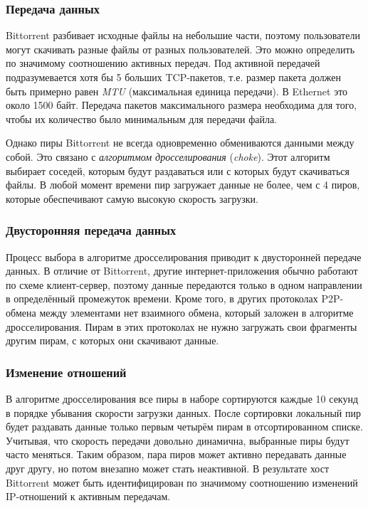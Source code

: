 \documentclass[bachelor, och, coursework]{SCWorks}
\begin{document}
\subsubsection{Передача данных}
Bittorrent разбивает исходные файлы на небольшие части, поэтому пользователи могут скачивать разные файлы
от разных пользователей. Это можно определить по значимому соотношению активных передач. Под активной передачей
подразумевается хотя бы 5 больших TCP-пакетов, т.е. размер пакета должен быть примерно равен \textit{MTU} (максимальная единица передачи). В Ethernet это около 1500 байт. Передача пакетов максимального размера необходима для того, 
чтобы их количество было минимальным для передачи файла.

Однако пиры Bittorrent не всегда одновременно обмениваются данными между собой. 
Это связано с \textit{алгоритмом дросселирования} (\textit{choke}). Этот алгоритм выбирает соседей, которым будут раздаваться или с которых будут скачиваться файлы. В любой момент времени пир загружает данные не более, чем 
с 4 пиров, которые обеспечивают самую высокую скорость загрузки. %
 
\subsubsection{Двусторонняя передача данных}
Процесс выбора в алгоритме дросселирования приводит к двусторонней передаче данных. В отличие от Bittorrent, другие 
интернет-приложения обычно работают по схеме клиент-сервер, поэтому данные передаются только в одном направлении в 
определённый промежуток времени. Кроме того, в других протоколах P2P-обмена между элементами нет взаимного обмена,
который заложен в алгоритме дросселирования. Пирам в этих протоколах не нужно загружать свои фрагменты другим пирам,
с которых они скачивают данные. 

\subsubsection{Изменение отношений}
В алгоритме дросселирования все пиры в наборе сортируются каждые 10 секунд в порядке убывания скорости загрузки данных.
После сортировки локальный пир будет раздавать данные только первым четырём пирам в отсортированном списке.
Учитывая, что скорость передачи довольно динамична, выбранные пиры будут часто меняться. Таким образом, пара пиров
может активно передавать данные друг другу, но потом внезапно может стать неактивной. В результате хост Bittorrent может
быть идентифицирован по значимому соотношению изменений IP-отношений к активным передачам.
\end{document}
